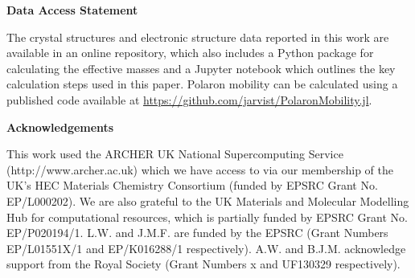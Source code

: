 \textbf{Data Access Statement}

The crystal structures and electronic structure data reported in this work are available 
in an online repository,\autocite{Whalley2018b} 
which also includes a Python package for calculating the effective masses and a Jupyter notebook which outlines the key calculation steps used in this paper.\autocite{Whalley2018a}
Polaron mobility can be calculated using a published code available at \url{https://github.com/jarvist/PolaronMobility.jl}.\autocite{Frost2018}

\textbf{Acknowledgements}

This work used the ARCHER UK National Supercomputing Service \\ (http://www.archer.ac.uk) which we have access to via our membership of the UK's HEC Materials Chemistry Consortium (funded by EPSRC Grant No. EP/L000202). We are also grateful to the UK Materials and Molecular Modelling Hub for computational resources, which is partially funded by EPSRC Grant No. EP/P020194/1. L.W. and J.M.F. are funded by the EPSRC (Grant Numbers EP/L01551X/1 and EP/K016288/1 respectively). A.W. and B.J.M. acknowledge support from the Royal Society (Grant Numbers x and UF130329 respectively).